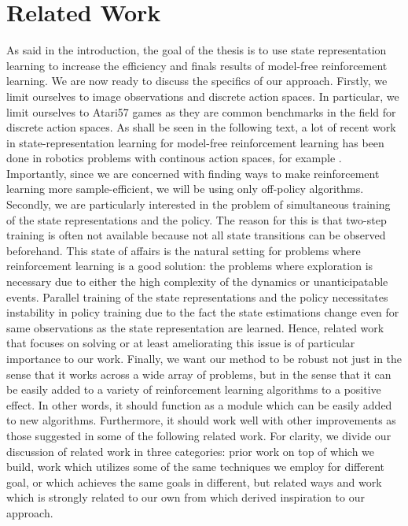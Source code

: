 \chapter{Related Work}
As said in the introduction, the goal of the thesis is to use
state representation learning to increase the efficiency 
and finals results of model-free reinforcement learning.
We are now ready to discuss the specifics of our approach.
Firstly, we limit ourselves to image observations and discrete action spaces.
In particular, we limit ourselves to Atari57 games as they are common benchmarks in the field
for discrete action spaces.
As shall be seen in the following text, a lot of recent work in state-representation learning
for model-free reinforcement learning has been done in robotics problems with 
continous action spaces, for example \cite{sac+ae}. %
Importantly, since we are concerned with finding ways to make  reinforcement learning
more sample-efficient, we will be using only off-policy algorithms.
Secondly, we are particularly interested in the problem of simultaneous training
of the state representations and the policy.
The reason for this is that two-step training is often not available because not all
state transitions can be observed beforehand.
This state of affairs is the natural setting for problems where reinforcement learning
is a good solution: the problems where exploration is necessary due to
either the high complexity of the dynamics or unanticipatable events.
Parallel training of the state representations and the policy necessitates
instability in policy training due to the fact the state estimations
change even for same observations as the state representation are learned.
Hence, related work that focuses on solving or at least ameliorating this issue 
is of particular importance to our work.
Finally, we want our method to be robust not just in the sense that it works
across a wide array of problems, but in the sense that it can be 
easily added to a variety of reinforcement learning algorithms
to a positive effect. In other words, it should function as a module
which can be easily added to new algorithms.
Furthermore, it should work well with other improvements as those suggested
in some of the following related work.
For clarity, we divide our discussion of related work in three categories:
prior work on top of which we build, work which utilizes some of the same
techniques we employ for different goal, or which achieves the same goals
in different, but related ways and work which is strongly related to our own
from which derived inspiration to our approach.

